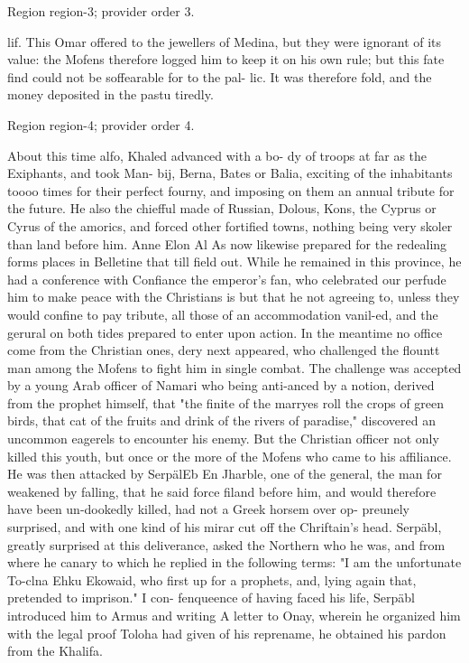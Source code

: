 \documentclass[11pt]{article}
\begin{document}
{\scriptsize\color{gray} Region region-3; provider order 3.\par}
\medskip

lif. This Omar offered to the jewellers of Medina, but they were ignorant of its value: the Mofens therefore logged him to keep it on his own rule; but this fate find could not be soffearable for to the pal- lic. It was therefore fold, and the money deposited in the pastu tiredly.
\par

{\scriptsize\color{gray} Region region-4; provider order 4.\par}
\medskip

About this time alfo, Khaled advanced with a bo- dy of troops at far as the Exiphants, and took Man- bij, Berna, Bates or Balia, exciting of the inhabitants toooo times for their perfect fourny, and imposing on them an annual tribute for the future. He also the chiefful made of Russian, Dolous, Kons, the Cyprus or Cyrus of the amorics, and forced other fortified towns, nothing being very skoler than land before him. Anne Elon Al As now likewise prepared for the redealing forms places in Belletine that till field out. While he remained in this province, he had a conference with Confiance the emperor's fan, who celebrated our perfude him to make peace with the Christians is but that he not agreeing to, unless they would confine to pay tribute, all those of an accommodation vanil-ed, and the gerural on both tides prepared to enter upon action. In the meantime no office come from the Christian ones, dery next appeared, who challenged the flountt man among the Mofens to fight him in single combat. The challenge was accepted by a young Arab officer of Namari who being anti-anced by a notion, derived from the prophet himself, that "the finite of the marryes roll the crops of green birds, that cat of the fruits and drink of the rivers of paradise," discovered an uncommon eagerels to encounter his enemy. But the Christian officer not only killed this youth, but once or the more of the Mofens who came to his affiliance. He was then attacked by SerpälEb En Jharble, one of the general, the man for weakened by falling, that he said force filand before him, and would therefore have been un-dookedly killed, had not a Greek horsem over op- preunely surprised, and with one kind of his mirar cut off the Chriftain's head. Serpäbl, greatly surprised at this deliverance, asked the Northern who he was, and from where he canary to which he replied in the following terms: "I am the unfortunate To-clna Ehku Ekowaid, who first up for a prophets, and, lying again that, pretended to imprison." I con- fenqueence of having faced his life, Serpäbl introduced him to Armus and writing A letter to Onay, wherein he organized him with the legal proof Toloha had given of his reprename, he obtained his pardon from the Khalifa.
\par
\end{document}
